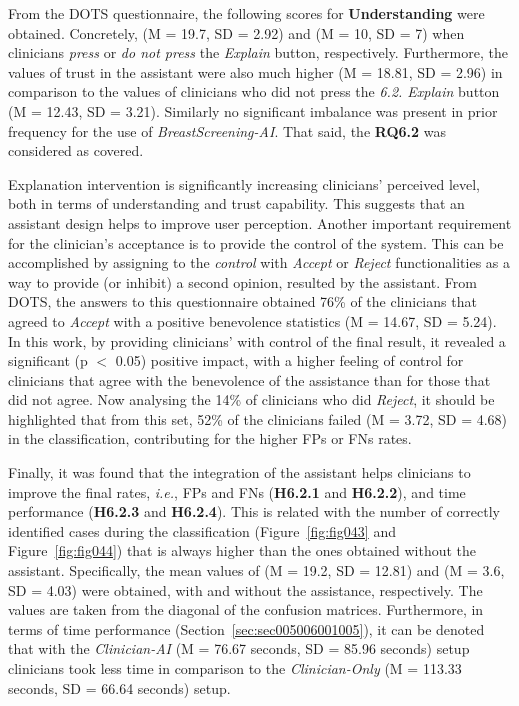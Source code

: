From the \ac{DOTS} questionnaire, the following scores for {\bf Understanding} were obtained.
Concretely, (M = 19.7, SD = 2.92) and (M = 10, SD = 7) when clinicians {\it press} or {\it do not press} the  {\it Explain} button, respectively.
Furthermore, the values of trust in the assistant were also much higher (M = 18.81, SD = 2.96) in comparison to the values of clinicians who did not press the {\it 6.2. Explain} button (M = 12.43, SD = 3.21).
Similarly no significant imbalance was present in prior frequency for the use of {\it BreastScreening-AI}.
That said, the {\bf RQ6.2} was considered as covered.

Explanation intervention is significantly increasing clinicians’ perceived level, both in terms of understanding and trust capability.
This suggests that an assistant design helps to improve user perception.
Another important requirement for the clinician's acceptance is to provide the control of the system.
This can be accomplished by assigning to the {\it control} with {\it Accept} or {\it Reject} functionalities as a way to provide (or inhibit) a second opinion, resulted by the assistant.
From \ac{DOTS}, the answers to this questionnaire obtained 76\% of the clinicians that agreed to {\it Accept} with a positive benevolence statistics (M = 14.67, SD = 5.24).
In this work, by providing clinicians' with control of the final result, it revealed a significant (p $<$ 0.05) positive impact, with a higher feeling of control for clinicians that agree with the benevolence of the assistance than for those that did not agree.
Now analysing the 14\% of clinicians who did {\it Reject}, it should be highlighted that from this set, 52\% of the clinicians failed (M = 3.72, SD = 4.68) in the classification, contributing for the higher \acp{FP} or \acp{FN} rates.

Finally, it was found that the integration of the assistant helps clinicians to improve the final rates, {\it i.e.}, \acp{FP} and \acp{FN} ({\bf H6.2.1} and {\bf H6.2.2}), and time performance ({\bf H6.2.3} and {\bf H6.2.4}).
This is related with the number of correctly identified cases during the classification (Figure~\ref{fig:fig043} and Figure~\ref{fig:fig044}) that is always higher than the ones obtained without the assistant.
Specifically, the mean values of (M = 19.2, SD = 12.81) and (M = 3.6, SD = 4.03) were obtained, with and without the assistance, respectively.
The values are taken from the diagonal of the confusion matrices.
Furthermore, in terms of time performance (Section~\ref{sec:sec005006001005}), it can be denoted that with the {\it Clinician-AI} (M = 76.67 seconds, SD = 85.96 seconds) setup clinicians took less time in comparison to the {\it Clinician-Only} (M = 113.33 seconds, SD = 66.64 seconds) setup.

